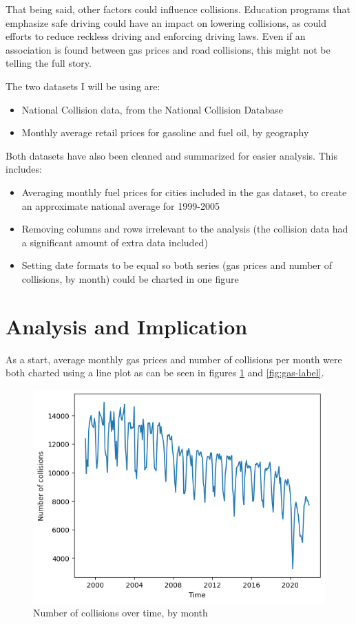 \documentclass[runningheads]{llncs}
\begin{document}
That being said, other factors could influence collisions. Education programs that emphasize safe driving could have an impact on lowering collisions, as could efforts to reduce reckless driving and enforcing driving laws. Even if an association is found between gas prices and road collisions, this might not be telling the full story.

The two datasets I will be using are:
\begin{itemize}
    \item National Collision data, from the National Collision Database \cite{ref_url1}
    \item Monthly average retail prices for gasoline and fuel oil, by geography \cite{ref_url2}
\end{itemize}

Both datasets have also been cleaned and summarized for easier analysis. This includes:
\begin{itemize}
    \item Averaging monthly fuel prices for cities included in the gas dataset, to create an approximate national average for 1999-2005
    \item Removing columns and rows irrelevant to the analysis (the collision data had a significant amount of extra data included)
    \item Setting date formats to be equal so both series (gas prices and number of collisions, by month) could be charted in one figure
\end{itemize}
\section{Analysis and Implication}
As a start, average monthly gas prices and number of collisions per month were both charted using a line plot as can be seen in figures \ref{fig:collision-label} and \ref{fig:gas-label}.
\begin{figure}
    \centering
    \includegraphics[scale=0.75]{Collision_Chart.png}
    \caption{Number of collisions over time, by month}
    \label{fig:collision-label}
\end{figure}
\end{document}

